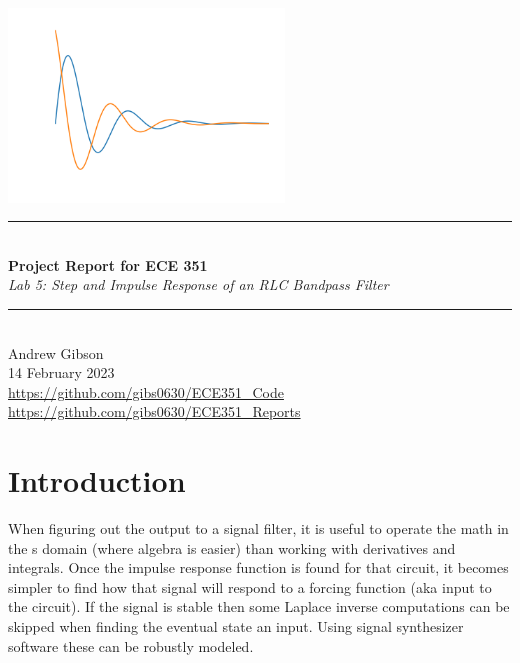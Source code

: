 \documentclass[12pt,a4paper]{article}
\newcommand{\HRule}{\rule{\linewidth}{0.5mm}}
\begin{document}
\begin{titlepage}
\begin{center}
\includegraphics[width=0.55\textwidth]{titlepage_image.png}~\\[2cm]
\HRule \\[0.4cm]
{ \LARGE 
  \textbf{Project Report for ECE 351}\\[0.4cm]
  \emph{Lab 5: Step and Impulse Response of an RLC Bandpass Filter}\\[0.4cm]
}
\HRule \\[1.5cm]
{ \large
  Andrew Gibson \\[0.1cm]
 14 February 2023\\[0.1cm]
  \url{https://github.com/gibs0630/ECE351\_Code}\\[0.1cm]
  \url{https://github.com/gibs0630/ECE351\_Reports}\\[0.1cm]
}
\vfill
{\large }
 
\end{center}
\end{titlepage}
\newpage
\tableofcontents
{}
\newpage
\setcounter{page}{1}
\section{Introduction}\label{sec:intro}
When figuring out the output to a signal filter, it is useful to operate the math in the s domain (where algebra is easier) than working with derivatives and integrals. Once the impulse response function is found for that circuit, it becomes simpler to find how that signal will respond to a forcing function (aka input to the circuit).  If the signal is stable then some Laplace inverse computations can be skipped when finding the eventual state an input. Using signal synthesizer software these can be robustly modeled.
\end{document}
